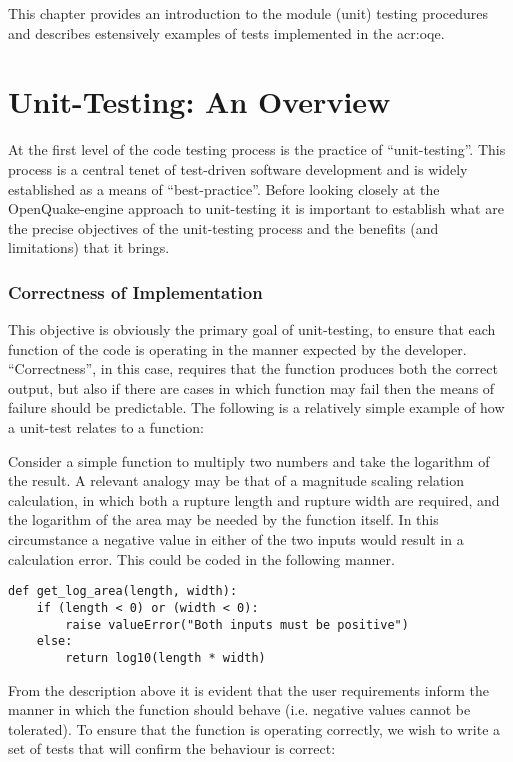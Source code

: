 This chapter provides an introduction to the module (unit) testing 
procedures \parencite{myers2012} and describes estensively examples 
of tests implemented in the \gls{acr:oqe}.

\section{Unit-Testing: An Overview}
%
At the first level of the code testing process is the practice of
``unit-testing''. This process is a central tenet of test-driven software
development and is widely established as a means of ``best-practice''. 
%
Before looking closely at the OpenQuake-engine
approach to unit-testing it is important to establish what are the 
precise objectives of the unit-testing process and the benefits (and 
limitations) that it brings.
%
\subsubsection{Correctness of Implementation}
This objective is obviously the primary goal of unit-testing, to 
ensure that each function of the code is operating in the manner 
expected by the developer. ``Correctness'', in this case, requires 
that the function produces both the correct output, but also if 
there are cases in which function may fail then the means of failure 
should be predictable. The following is a relatively simple example 
of how a unit-test relates to a function:

Consider a simple function to multiply two numbers and take the 
logarithm of the result. A relevant analogy may be that of a 
magnitude scaling relation calculation, in which both a rupture 
length and rupture width are required, and the logarithm of the 
area may be needed by the function itself. In this circumstance 
a negative value in either of the two inputs would result in a 
calculation error. This could be coded in the following manner. 

\begin{lstlisting}[frame=single]
def get_log_area(length, width):
    if (length < 0) or (width < 0):
        raise valueError("Both inputs must be positive")
    else:
        return log10(length * width)
\end{lstlisting}

From the description above it is evident that the user requirements  
inform the manner in which the function should behave (i.e. negative
values cannot be tolerated). To ensure that the function is operating
correctly, we wish to write a set of tests that will confirm the 
behaviour is correct:

